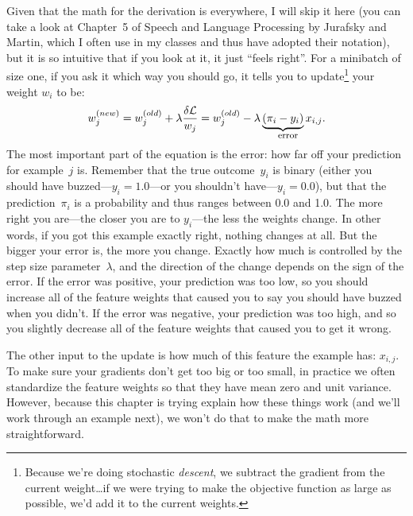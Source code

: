 Given that the math for the derivation is everywhere, I will skip it here (you
can take a look at Chapter~5 of Speech and Language Processing by Jurafsky
and Martin, which I often use in my classes and thus have adopted their
notation), but it is so intuitive that if you look at it, it just ``feels
right''.
%
For a minibatch of size one, if you ask it which way you should go, it tells
you to update\footnote{Because we're doing stochastic \emph{descent}, we
  subtract the gradient from the current weight\dots if we were trying to make
  the objective function as large as possible, we'd add it to the current
  weights.} your weight $w_i$ to be:
\begin{equation}
w_j^{(new)} = w_j^{(old)} + \lambda \frac{\delta \mathcal{L}}{{w_j}} =
w_j^{(old)} - \lambda \explain{error}{(\pi_i - y_i)} x_{i,j}.
  \label{eq:watson:update}
\end{equation}
The most important part of the equation is the error: how far off your
prediction for example~$j$ is.
%
Remember that the true outcome~$y_i$ is binary (either you should have
buzzed---$y_i=1.0$---or you shouldn't have---$y_i=0.0$), but that the
prediction~$\pi_i$ is a probability and thus ranges between 0.0 and 1.0.
%
The more right you are---the closer you are to $y_i$---the less the weights
change.
%
In other words, if you got this example exactly right, nothing changes at all.
%
But the bigger your error is, the more you change.
%
Exactly how much is controlled by the step size
parameter~$\lambda$, and the direction of the change depends on the sign of
the error.
%
If the error was positive, your prediction was too low, so you should increase all of the feature weights that caused you to
say you should have buzzed when you didn't.
%
If the error was negative, your prediction was too high, and so you slightly decrease all of the feature weights that
caused you to get it wrong.

The other input to the update is how much of this feature the example has:
$x_{i,j}$.
%
To make sure your gradients don't get too big or too small, in practice we often
standardize the feature weights so that they have mean zero and unit variance.
%
However, because this chapter is trying explain how these things work (and
we'll work through an example next), we won't do that to make the math more
straightforward.

